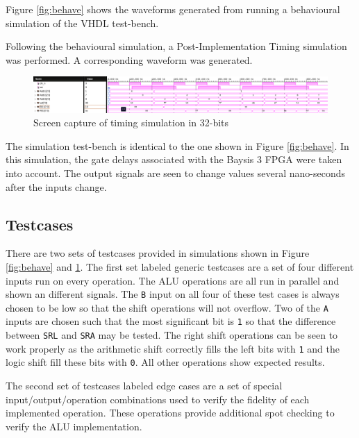 \documentclass[CMPE]{../KGCOEReport}
\def\code#1{\texttt{#1}}
\begin{document}
    Figure \ref{fig:behave} shows the waveforms generated from running a behavioural simulation of the VHDL
    test-bench.

    \pagebreak

    Following the behavioural simulation, a Post-Implementation Timing simulation was performed.
    A corresponding waveform was generated.

    \begin{figure}[h!]
        \centering
        \includegraphics[width=\textwidth]{img/synthesis-timing}
        \caption{Screen capture of timing simulation in 32-bits}
        \label{fig:timing}
    \end{figure}

    The simulation test-bench is identical to the one shown in Figure \ref{fig:behave}.
    In this simulation, the gate delays associated with the Baysis 3 FPGA were taken into account.
    The output signals are seen to change values several nano-seconds after the inputs change.

    \subsection*{Testcases}
    There are two sets of testcases provided in simulations shown in Figure \ref{fig:behave} and \ref{fig:timing}.
    The first set labeled generic testcases are a set of four different inputs run on every operation.
    The ALU operations are all run in parallel and shown an different signals.
    The \code{B} input on all four of these test cases is always chosen to be low so that the shift operations
    will not overflow.
    Two of the \code{A} inputs are chosen such that the most significant bit is \code{1} so that the difference between
    \code{SRL} and \code{SRA} may be tested.
    The right shift operations can be seen to work properly as the arithmetic shift correctly fills the left bits with
    \code{1} and the logic shift fill these bits with \code{0}.
    All other operations show expected results.

    The second set of testcases labeled edge cases are a set of special input/output/operation combinations used to
    verify the fidelity of each implemented operation.
    These operations provide additional spot checking to verify the ALU implementation.
\end{document}
